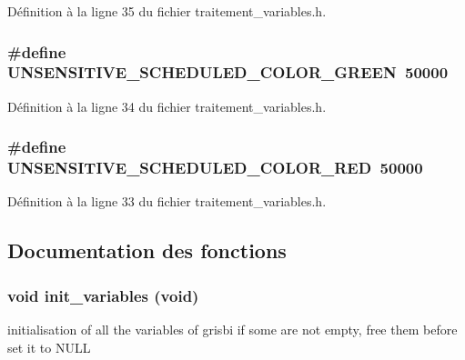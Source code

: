 Définition à la ligne 35 du fichier traitement\_\-variables.h.

\subsubsection[{UNSENSITIVE\_\-SCHEDULED\_\-COLOR\_\-GREEN}]{\setlength{\rightskip}{0pt plus 5cm}\#define UNSENSITIVE\_\-SCHEDULED\_\-COLOR\_\-GREEN~50000}\label{traitement__variables_8h_a25d3f4ea9bd215552cb5dd3626c9c491}


Définition à la ligne 34 du fichier traitement\_\-variables.h.

\subsubsection[{UNSENSITIVE\_\-SCHEDULED\_\-COLOR\_\-RED}]{\setlength{\rightskip}{0pt plus 5cm}\#define UNSENSITIVE\_\-SCHEDULED\_\-COLOR\_\-RED~50000}\label{traitement__variables_8h_af9d1c4873e15a879dfcdab9fe384a582}


Définition à la ligne 33 du fichier traitement\_\-variables.h.



\subsection{Documentation des fonctions}
\subsubsection[{init\_\-variables}]{\setlength{\rightskip}{0pt plus 5cm}void init\_\-variables (void)}\label{traitement__variables_8h_a2977fbd2f72d5a8a5da608f804bd2a6f}
initialisation of all the variables of grisbi if some are not empty, free them before set it to NULL


